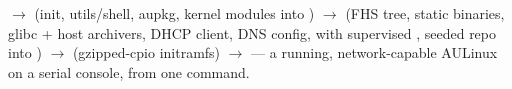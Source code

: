 \begin{infobox}
 $\rightarrow$  (init, utils/shell,
aupkg, kernel modules into ) $\rightarrow$ 
(FHS tree, static binaries, glibc + host archivers, DHCP client, DNS config,
 with supervised , seeded  repo
into ) $\rightarrow$ 
(gzipped-cpio initramfs) $\rightarrow$  --- a running, network-capable AULinux
on a serial console, from one command.
\end{infobox}
